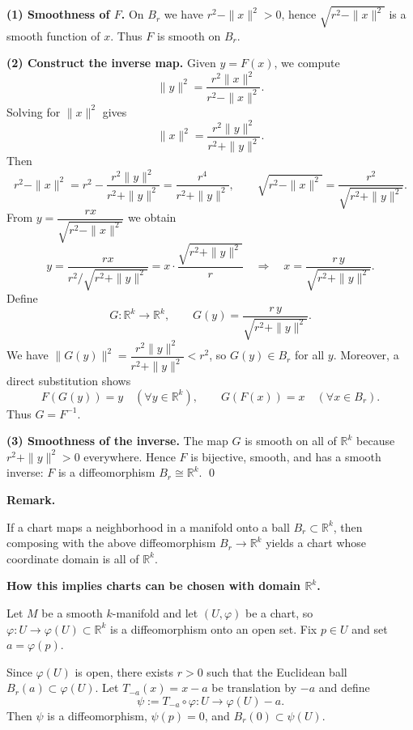 \begin{solution}
\textbf{(1) Smoothness of $F$.}
On $B_r$ we have $r^2-\|x\|^2>0$, hence $\sqrt{r^2-\|x\|^2}$ is a smooth function of $x$.
Thus $F$ is smooth on $B_r$.

\medskip
\textbf{(2) Construct the inverse map.}
Given $y=F(x)$, we compute
\[
\|y\|^2=\frac{r^2\|x\|^2}{r^2-\|x\|^2}.
\]
Solving for $\|x\|^2$ gives
\[
\|x\|^2=\frac{r^2\|y\|^2}{r^2+\|y\|^2}.
\]
Then
\[
r^2-\|x\|^2
=r^2-\frac{r^2\|y\|^2}{r^2+\|y\|^2}
=\frac{r^4}{r^2+\|y\|^2},
\qquad
\sqrt{r^2-\|x\|^2}=\frac{r^2}{\sqrt{r^2+\|y\|^2}}.
\]
From $y=\dfrac{r x}{\sqrt{r^2-\|x\|^2}}$ we obtain
\[
y= \frac{r x}{r^2/\sqrt{r^2+\|y\|^2}}
= x\cdot\frac{\sqrt{r^2+\|y\|^2}}{r}
\quad\Longrightarrow\quad
x=\frac{r\,y}{\sqrt{r^2+\|y\|^2}}.
\]
Define
\[
G:\mathbb{R}^k\to \mathbb{R}^k,\qquad
G(y)=\frac{r\,y}{\sqrt{r^2+\|y\|^2}}.
\]
We have $\|G(y)\|^2=\dfrac{r^2\|y\|^2}{r^2+\|y\|^2}<r^2$, so $G(y)\in B_r$ for all $y$.
Moreover, a direct substitution shows
\[
F(G(y))=y\quad(\forall y\in\mathbb{R}^k),
\qquad
G(F(x))=x\quad(\forall x\in B_r).
\]
Thus $G=F^{-1}$.

\medskip
\textbf{(3) Smoothness of the inverse.}
The map $G$ is smooth on all of $\mathbb{R}^k$ because $r^2+\|y\|^2>0$ everywhere.
Hence $F$ is bijective, smooth, and has a smooth inverse: $F$ is a diffeomorphism
$B_r\cong\mathbb{R}^k$.
\qed

\par\medskip\noindent\textbf{Remark.}\par\smallskip

If a chart maps a neighborhood in a manifold onto a ball $B_r\subset\mathbb{R}^k$,
then composing with the above diffeomorphism $B_r\to\mathbb{R}^k$ yields a chart
whose coordinate domain is all of $\mathbb{R}^k$.


\par\medskip\noindent\textbf{How this implies charts can be chosen with domain $\mathbb{R}^k$.}\par\smallskip

Let $M$ be a smooth $k$-manifold and let $(U,\varphi)$ be a chart, so
$\varphi:U\to \varphi(U)\subset\mathbb{R}^k$ is a diffeomorphism onto an open set.
Fix $p\in U$ and set $a=\varphi(p)$.

Since $\varphi(U)$ is open, there exists $r>0$ such that the Euclidean ball
$B_r(a)\subset \varphi(U)$. Let $T_{-a}(x)=x-a$ be translation by $-a$ and define
\[
\psi := T_{-a}\circ \varphi : U\longrightarrow \varphi(U)-a .
\]
Then $\psi$ is a diffeomorphism, $\psi(p)=0$, and $B_r(0)\subset \psi(U)$.


\end{solution}
